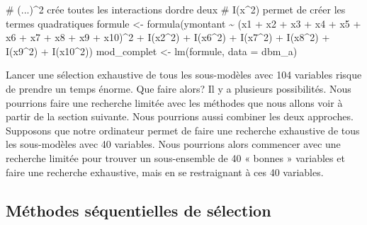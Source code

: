 \documentclass[
  11pt,
  letterpaper,
]{scrbook}
\newenvironment{Shaded}{\begin{snugshade}}{\end{snugshade}}
\newcommand{\AttributeTok}[1]{\textcolor[rgb]{0.40,0.45,0.13}{#1}}
\newcommand{\CommentTok}[1]{\textcolor[rgb]{0.37,0.37,0.37}{#1}}
\newcommand{\DecValTok}[1]{\textcolor[rgb]{0.68,0.00,0.00}{#1}}
\newcommand{\FunctionTok}[1]{\textcolor[rgb]{0.28,0.35,0.67}{#1}}
\newcommand{\NormalTok}[1]{\textcolor[rgb]{0.00,0.23,0.31}{#1}}
\newcommand{\OtherTok}[1]{\textcolor[rgb]{0.00,0.23,0.31}{#1}}
\newcommand{\SpecialCharTok}[1]{\textcolor[rgb]{0.37,0.37,0.37}{#1}}
\theoremstyle{definition}
\theoremstyle{remark}
\begin{document}
\begin{Shaded}
\begin{Highlighting}[]
\CommentTok{\# (...)\^{}2 crée toutes les interactions d\textquotesingle{}ordre deux}
\CommentTok{\# I(x\^{}2) permet de créer les termes quadratiques}
\NormalTok{formule }\OtherTok{\textless{}{-}} 
  \FunctionTok{formula}\NormalTok{(ymontant }\SpecialCharTok{\textasciitilde{}} 
\NormalTok{          (x1 }\SpecialCharTok{+}\NormalTok{ x2 }\SpecialCharTok{+}\NormalTok{ x3 }\SpecialCharTok{+}\NormalTok{ x4 }\SpecialCharTok{+}\NormalTok{ x5 }\SpecialCharTok{+} 
\NormalTok{             x6 }\SpecialCharTok{+}\NormalTok{ x7 }\SpecialCharTok{+}\NormalTok{ x8 }\SpecialCharTok{+}\NormalTok{ x9 }\SpecialCharTok{+}\NormalTok{ x10)}\SpecialCharTok{\^{}}\DecValTok{2} \SpecialCharTok{+} 
            \FunctionTok{I}\NormalTok{(x2}\SpecialCharTok{\^{}}\DecValTok{2}\NormalTok{) }\SpecialCharTok{+} \FunctionTok{I}\NormalTok{(x6}\SpecialCharTok{\^{}}\DecValTok{2}\NormalTok{) }\SpecialCharTok{+} \FunctionTok{I}\NormalTok{(x7}\SpecialCharTok{\^{}}\DecValTok{2}\NormalTok{) }\SpecialCharTok{+}
            \FunctionTok{I}\NormalTok{(x8}\SpecialCharTok{\^{}}\DecValTok{2}\NormalTok{) }\SpecialCharTok{+} \FunctionTok{I}\NormalTok{(x9}\SpecialCharTok{\^{}}\DecValTok{2}\NormalTok{) }\SpecialCharTok{+} \FunctionTok{I}\NormalTok{(x10}\SpecialCharTok{\^{}}\DecValTok{2}\NormalTok{))}
\NormalTok{mod\_complet }\OtherTok{\textless{}{-}} \FunctionTok{lm}\NormalTok{(formule, }\AttributeTok{data =}\NormalTok{ dbm\_a)}
\end{Highlighting}
\end{Shaded}

Lancer une sélection exhaustive de tous les sous-modèles avec 104
variables risque de prendre un temps énorme. Que faire alors? Il y a
plusieurs possibilités. Nous pourrions faire une recherche limitée avec
les méthodes que nous allons voir à partir de la section suivante. Nous
pourrions aussi combiner les deux approches. Supposons que notre
ordinateur permet de faire une recherche exhaustive de tous les
sous-modèles avec 40 variables. Nous pourrions alors commencer avec une
recherche limitée pour trouver un sous-ensemble de 40 « bonnes »
variables et faire une recherche exhaustive, mais en se restraignant à
ces 40 variables.

\hypertarget{muxe9thodes-suxe9quentielles-de-suxe9lection}{%
\subsection{Méthodes séquentielles de
sélection}\label{muxe9thodes-suxe9quentielles-de-suxe9lection}}
\end{document}
